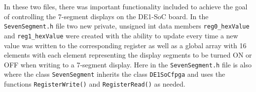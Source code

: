 \documentclass[
	letterpaper, %
	10pt, %
]{CSUniSchoolLabReport}
\begin{document}





  In these two files, there was important functionality included to achieve the goal of controlling the 7-segment displays on the DE1-SoC board. In the \texttt{SevenSegment.h} file two new private, unsigned int data members \texttt{reg0\_hexValue} and \texttt{reg1\_hexValue} were created with the ability to update every time a new value was written to the corresponding register as well as a global array with 16 elements with each element representing the display segments to be turned ON or OFF when writing to a 7-segment display. Here in the \texttt{SevenSegment.h} file is also where the class \texttt{SevenSegment} inherits the class \texttt{DE1SoCfpga} and uses the functions \texttt{RegisterWrite()} and \texttt{RegisterRead()} as needed. \\
\end{document}
